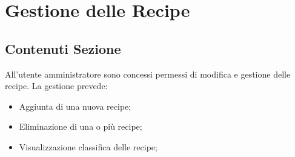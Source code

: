 %

\section{Gestione delle Recipe} %
\label{sec:gestione_delle_recipe}


	\subsection{Contenuti Sezione} %
	\label{sub:contenuti_sezione}
		All'utente amministratore sono concessi permessi di modifica e gestione delle recipe\gloss{}.
		La gestione prevede:
		\begin{itemize}
			\item Aggiunta di una nuova recipe\gloss{};
			\item Eliminazione di una o più recipe\gloss{};
			\item Visualizzazione classifica delle recipe\gloss{};
		\end{itemize}


